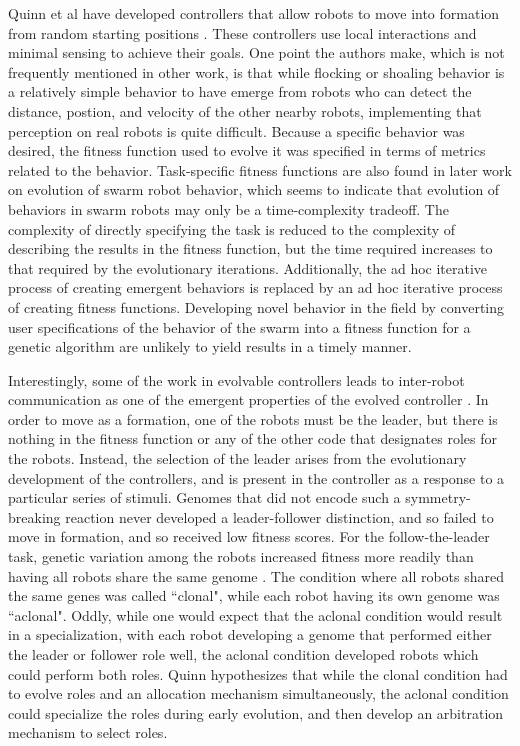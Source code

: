 \documentclass[]{article}
\begin{document}
Quinn et al have developed controllers that allow robots to move into formation from random starting positions \cite{quinn2003evolving}. 
These controllers use local interactions and minimal sensing to achieve their goals. 
One point the authors make, which is not frequently mentioned in other work, is that while flocking or shoaling behavior is a relatively simple behavior to have emerge from robots who can detect the distance, postion, and velocity of the other nearby robots, implementing that perception on real robots is quite difficult.
Because a specific behavior was desired, the fitness function used to evolve it was specified in terms of metrics related to the behavior. 
Task-specific fitness functions are also found in later work on evolution of swarm robot behavior, which seems to indicate that evolution of behaviors in swarm robots may only be a time-complexity tradeoff. 
The complexity of directly specifying the task is reduced to the complexity of describing the results in the fitness function, but the time required increases to that required by the evolutionary iterations. 
Additionally, the ad hoc iterative process of creating emergent behaviors is replaced by an ad hoc iterative process of creating fitness functions.
Developing novel behavior in the field by converting user specifications of the behavior of the swarm into a fitness function for a genetic algorithm are unlikely to yield results in a timely manner. 

Interestingly, some of the work in evolvable controllers leads to inter-robot communication as one of the emergent properties of the evolved controller \cite{quinn2001evolving}.
In order to move as a formation, one of the robots must be the leader, but there is nothing in the fitness function or any of the other code that designates roles for the robots. 
Instead, the selection of the leader arises from the evolutionary development of the controllers, and is present in the controller as a response to a particular series of stimuli. 
Genomes that did not encode such a symmetry-breaking reaction never developed a leader-follower distinction, and so failed to move in formation, and so received low fitness scores. 
For the follow-the-leader task, genetic variation among the robots increased fitness more readily than having all robots share the same genome \cite{quinn2001comparison}.
The condition where all robots shared the same genes was called ``clonal", while each robot having its own genome was ``aclonal".
Oddly, while one would expect that the aclonal condition would result in a specialization, with each robot developing a genome that performed either the leader or follower role well, the aclonal condition developed robots which could perform both roles. 
Quinn hypothesizes that while the clonal condition had to evolve roles and an allocation mechanism simultaneously, the aclonal condition could specialize the roles during early evolution, and then develop an arbitration mechanism to select roles.
\end{document}
